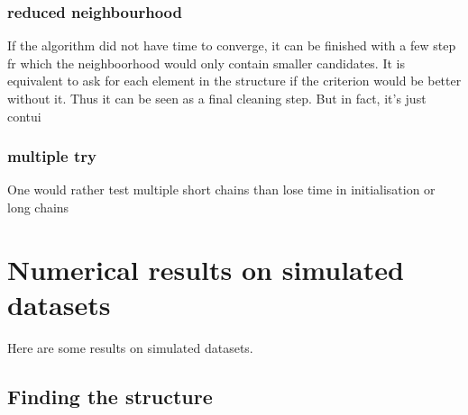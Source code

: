 \documentclass[11pt,a4paper]{article}
\begin{document}
	\subsubsection{reduced neighbourhood}
	If the algorithm did not have time to converge, it can be finished with a few step fr which the neighboorhood would only contain smaller candidates. It is equivalent to ask for each element in the structure if the criterion would be better without it. Thus it can be seen as a final cleaning step. But in fact, it's just contui
	\subsubsection{multiple try}
	One would rather test multiple short chains than lose time in initialisation or long chains
\section{Numerical results on simulated datasets}
	Here are some results on simulated datasets. 
	\subsection{Finding the structure}
\end{document}
